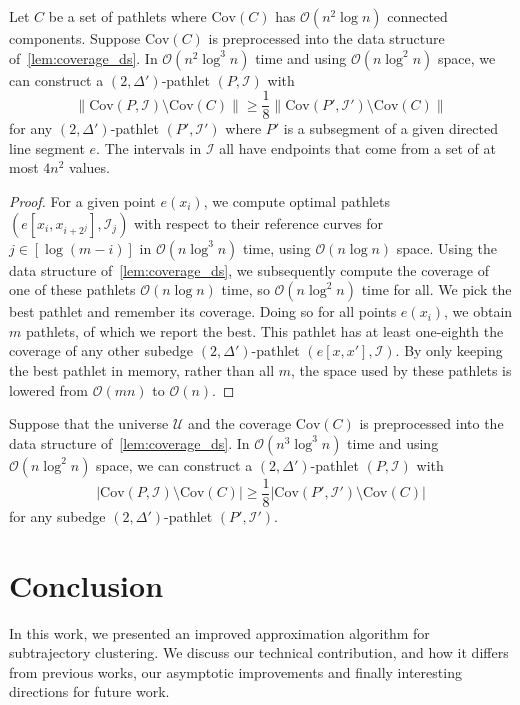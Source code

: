 \documentclass[a4paper,UKenglish,cleveref,thm-restate,notab]{lipics-v2021}
\newcommand{\bigO}{\mathcal{O}}
\newcommand{\I}{\mathcal{I}}
\newcommand{\U}{\mathcal{U}}
\newcommand{\Cov}{\ensuremath{\mathrm{Cov}}}
\begin{document}
    \begin{lemma}
        Let $C$ be a set of pathlets where $\Cov(C)$ has $\bigO(n^2 \log n)$ connected components.
        Suppose $\Cov(C)$ is preprocessed into the data structure of~\cref{lem:coverage_ds}.
        In $\bigO(n^2 \log^3 n)$ time and using $\bigO(n \log^2 n)$ space, we can construct a $(2, \Delta')$-pathlet $(P, \I)$ with
        \[
            \lVert \Cov(P, \I) \setminus \Cov(C) \rVert \geq \frac{1}{8} \lVert \Cov(P', \I') \setminus \Cov(C) \rVert
        \]
        for any $(2, \Delta')$-pathlet $(P', \I')$ where $P'$ is a subsegment of a given directed line segment $e$.
        The intervals in $\I$ all have endpoints that come from a set of at most $4n^2$ values.
    \end{lemma}
    \begin{proof}
        For a given point $e(x_i)$, we compute optimal pathlets $(e[x_i, x_{i+2^j}], \I_j)$ with respect to their reference curves for $j \in [\log (m-i)]$ in $\bigO(n \log^3 n)$ time, using $\bigO(n \log n)$ space.
        Using the data structure of~\cref{lem:coverage_ds}, we subsequently compute the coverage of one of these pathlets $\bigO(n \log n)$ time, so $\bigO(n \log^2 n)$ time for all.
        We pick the best pathlet and remember its coverage.
        Doing so for all points $e(x_i)$, we obtain $m$ pathlets, of which we report the best.
        This pathlet has at least one-eighth the coverage of any other subedge $(2, \Delta')$-pathlet $(e[x, x'], \I)$.
        By only keeping the best pathlet in memory, rather than all $m$, the space used by these pathlets is lowered from $\bigO(mn)$ to $\bigO(n)$.
    \end{proof}
    
    \begin{theorem}
    \label{thm:constructing_subedge}
        Suppose that the universe $\U$ and the coverage $\Cov(C)$ is preprocessed into the data structure of~\cref{lem:coverage_ds}.
        In $\bigO(n^3 \log^3 n)$ time and using $\bigO(n \log^2 n)$ space, we can construct a $(2, \Delta')$-pathlet $(P, \I)$ with
        \[
            | \Cov(P, \I) \setminus \Cov(C) | \geq \frac{1}{8} | \Cov(P', \I') \setminus \Cov(C) |
        \]
        for any subedge $(2, \Delta')$-pathlet $(P', \I')$.
    \end{theorem}

\section{Conclusion}
    In this work, we presented an improved approximation algorithm for subtrajectory clustering.
    We discuss our technical contribution, and how it differs from previous works, our asymptotic improvements and finally interesting directions for future work. 
\end{document}
